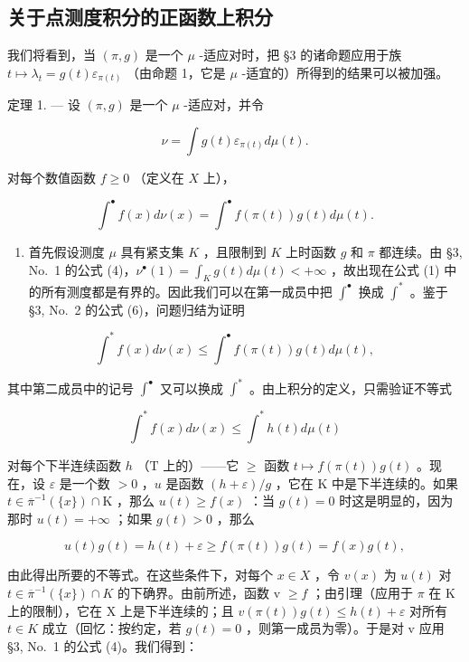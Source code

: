\subsection{关于点测度积分的正函数上积分}

我们将看到，当 \((\pi,g)\) 是一个 \(\mu\) -适应对时，把 §3 的诸命题应用于族 \(t\mapsto\lambda_{t}=g(t)\varepsilon_{\pi(t)}\) （由命题 1，它是 \(\mu\) -适宜的）所得到的结果可以被加强。

定理 1. --- 设 \((\pi, g)\) 是一个 \(\mu\) -适应对，并令

\[
\nu = \int g (t) \varepsilon_ {\pi (t)} d \mu (t).
\]

对每个数值函数 \(f \geqslant 0\) （定义在 \(X\) 上），

\[
\int^ {\bullet} f (x) d \nu (x) = \int^ {\bullet} f (\pi (t)) g (t) d \mu (t).\tag{1}
\]

\begin{enumerate}
\def\labelenumi{\Alph{enumi})}
\tightlist
\item
  首先假设测度 \(\mu\) 具有紧支集 \(K\) ，且限制到 \(K\) 上时函数 \(g\) 和 \(\pi\) 都连续。由 §3, No.~1 的公式 (4)，\(\nu^{\bullet}(1) = \int_{K} g(t) d\mu(t) < +\infty\) ，故出现在公式 (1) 中的所有测度都是有界的。因此我们可以在第一成员中把 \(\int^{\bullet}\) 换成 \(\int^{*}\) 。鉴于 §3, No.~2 的公式 (6)，问题归结为证明
\end{enumerate}

\[
\int^ {*} f (x) d \nu (x) \leqslant \int^ {\bullet} f (\pi (t)) g (t) d \mu (t),\tag{2}
\]

其中第二成员中的记号 \(\int^{\bullet}\) 又可以换成 \(\int^{*}\) 。由上积分的定义，只需验证不等式

\[
\int^ {*} f (x) d \nu (x) \leqslant \int^ {*} h (t) d \mu (t)\tag{3}
\]

对每个下半连续函数 \(h\) （\(\mathrm{T}\) 上的）——它 \(\geqslant\) 函数 \(t \mapsto f(\pi(t))g(t)\) 。现在，设 \(\varepsilon\) 是一个数 \(> 0\) ，\(u\) 是函数 \((h + \varepsilon)/g\) ，它在 \(\mathrm{K}\) 中是下半连续的。如果 \(t \in \overline{\pi}^{-1}(\{x\}) \cap \mathrm{K}\) ，那么 \(u(t) \geqslant f(x)\) ：当 \(g(t) = 0\) 时这是明显的，因为那时 \(u(t) = +\infty\) ；如果 \(g(t) > 0\) ，那么

\[
u (t) g (t) = h (t) + \varepsilon \geqslant f (\pi (t)) g (t) = f (x) g (t),
\]

由此得出所要的不等式。在这些条件下，对每个 \(x \in X\) ，令 \(v(x)\) 为 \(u(t)\) 对 \(t \in \overline{\pi}^{-1}(\{x\}) \cap K\) 的下确界。由前所述，函数 v \(\geqslant f\) ；由引理（应用于 \(\pi\) 在 K 上的限制），它在 X 上是下半连续的；且 \(v(\pi(t))g(t) \leqslant h(t) + \varepsilon\) 对所有 \(t \in K\) 成立（回忆：按约定，若 \(g(t) = 0\) ，则第一成员为零）。于是对 v 应用 §3, No.~1 的公式 (4)。我们得到：

